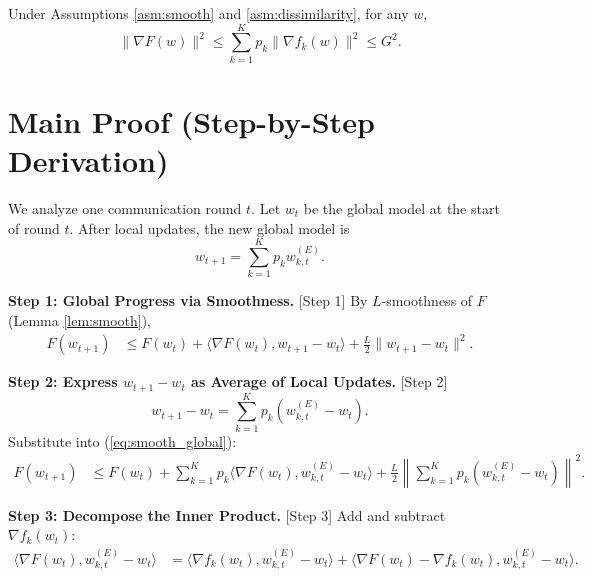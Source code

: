 \documentclass{article}
\begin{document}
\begin{lemma} \label{lem:grad_bound}
    Under Assumptions \ref{asm:smooth} and \ref{asm:dissimilarity}, for any $w$,
    \begin{equation}
        \| \nabla F(w) \|^2 \leq \sum_{k=1}^K p_k \| \nabla f_k(w) \|^2 \leq G^2.
    \end{equation}
\end{lemma}

\section*{Main Proof (Step-by-Step Derivation)}

We analyze one communication round $t$. Let $w_t$ be the global model at the start of round $t$. After local updates, the new global model is
\begin{equation}
    w_{t+1} = \sum_{k=1}^K p_k w_{k,t}^{(E)}.
\end{equation}

\textbf{Step 1: Global Progress via Smoothness.} [Step 1]
By $L$-smoothness of $F$ (Lemma \ref{lem:smooth}),
\begin{align}
    F(w_{t+1}) &\leq F(w_t) + \langle \nabla F(w_t), w_{t+1} - w_t \rangle + \frac{L}{2} \| w_{t+1} - w_t \|^2. \label{eq:smooth_global}
\end{align}

\textbf{Step 2: Express $w_{t+1} - w_t$ as Average of Local Updates.} [Step 2]
\begin{equation}
    w_{t+1} - w_t = \sum_{k=1}^K p_k (w_{k,t}^{(E)} - w_t).
\end{equation}
Substitute into (\ref{eq:smooth_global}):
\begin{align}
    F(w_{t+1}) &\leq F(w_t) + \sum_{k=1}^K p_k \langle \nabla F(w_t), w_{k,t}^{(E)} - w_t \rangle + \frac{L}{2} \left\| \sum_{k=1}^K p_k (w_{k,t}^{(E)} - w_t) \right\|^2. \label{eq:global_progress}
\end{align}

\textbf{Step 3: Decompose the Inner Product.} [Step 3]
Add and subtract $\nabla f_k(w_t)$:
\begin{align}
    \langle \nabla F(w_t), w_{k,t}^{(E)} - w_t \rangle &= \langle \nabla f_k(w_t), w_{k,t}^{(E)} - w_t \rangle + \langle \nabla F(w_t) - \nabla f_k(w_t), w_{k,t}^{(E)} - w_t \rangle. \label{eq:inner_decomp}
\end{align}
\end{document}
